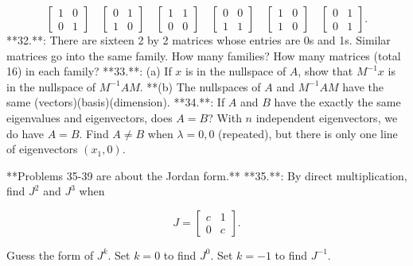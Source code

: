 \[\begin{bmatrix}1&0\\ 0&1\end{bmatrix}\quad\begin{bmatrix}0&1\\ 1&0\end{bmatrix}\quad\begin{bmatrix}1&1\\ 0&0\end{bmatrix}\quad\begin{bmatrix}0&0\\ 1&1\end{bmatrix}\quad\begin{bmatrix}1&0\\ 1&0\end{bmatrix}\quad\begin{bmatrix}0&1\\ 0&1\end{bmatrix}.\]
**32.**: There are sixteen 2 by 2 matrices whose entries are 0s and 1s. Similar matrices go into the same family. How many families? How many matrices (total 16) in each family?
**33.**: (a) If \(x\) is in the nullspace of \(A\), show that \(M^{-1}x\) is in the nullspace of \(M^{-1}AM\).
**(b) The nullspaces of \(A\) and \(M^{-1}AM\) have the same (vectors)(basis)(dimension).
**34.**: If \(A\) and \(B\) have the exactly the same eigenvalues and eigenvectors, does \(A=B\)? With \(n\) independent eigenvectors, we do have \(A=B\). Find \(A\neq B\) when \(\lambda=0,0\) (repeated), but there is only one line of eigenvectors \((x_{1},0)\).

**Problems 35-39 are about the Jordan form.**
**35.**: By direct multiplication, find \(J^{2}\) and \(J^{3}\) when

\[J=\begin{bmatrix}c&1\\ 0&c\end{bmatrix}.\]

Guess the form of \(J^{k}\). Set \(k=0\) to find \(J^{0}\). Set \(k=-1\) to find \(J^{-1}\).

